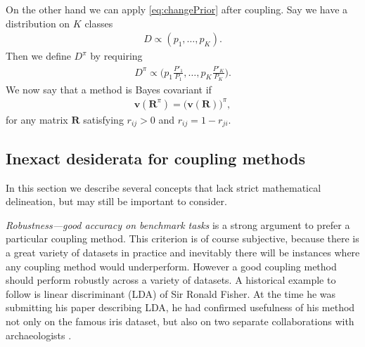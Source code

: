 On the other hand we can apply \eqref{eq:changePrior} after coupling. Say we have a distribution on $K$ classes
\begin{align}
D \propto (p_1, \ldots, p_K).
\end{align}
Then we define $D^\pi$ by requiring 
\begin{align}
D^\pi \propto \biggl(p_1 \frac{P'_1}{P_1}, \ldots, p_K \frac{P'_K}{P_K}\biggr). \label{def:prior:effect}
\end{align}
We now say that a method is Bayes covariant if
\begin{align}
\boldsymbol{v}(\boldsymbol{R}^\pi)=	\bigl(\boldsymbol{v}(\boldsymbol{R})\bigr)^\pi,
\end{align}
for any matrix $\boldsymbol{R}$ satisfying $r_{ij}> 0$ and $r_{ij} = 1 - r_{ji}$.




%


\subsection{Inexact desiderata for coupling methods}

\label{sec:des:inexact}

In this section we describe several concepts that lack strict mathematical delineation, but may still be important to consider.

\emph{Robustness---good accuracy on benchmark tasks} is  a strong argument to prefer a particular coupling method. This criterion is of course subjective, because there is a great variety of datasets in practice and inevitably there will be instances where any coupling method would underperform. However a good coupling method should perform robustly across a variety of datasets. A historical  example to follow is linear discriminant (LDA) of  Sir Ronald Fisher. At the time he was submitting his paper describing LDA, he had confirmed usefulness of his method not only on the famous iris dataset, but also on two separate collaborations with archaeologists \cite{barnard1935secular, martin1936study}. 

